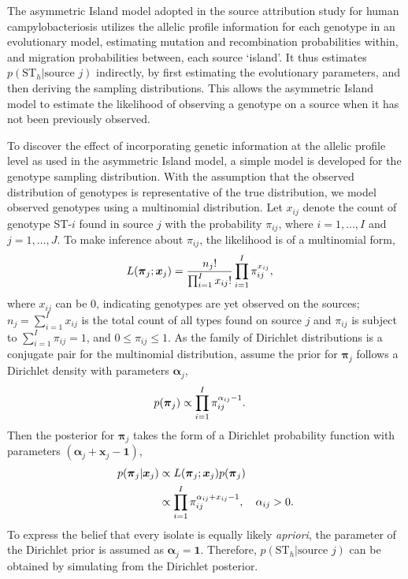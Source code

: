 \documentclass[AMA,STIX1COL]{WileyNJD-v2}
\begin{document}
The asymmetric Island model \cite{Wilso} adopted in the source attribution study for human campylobacteriosis \cite{Marsh} utilizes the allelic profile information for each genotype in an evolutionary model, estimating mutation and recombination probabilities within, and migration probabilities between, each source `island'. It thus estimates $p(\text{ST}_h \vert \text{source }j)$ indirectly, by first estimating the evolutionary parameters, and then deriving the sampling distributions. This allows the asymmetric Island model to estimate the likelihood of observing a genotype on a source when it has not been previously observed.

To discover the effect of incorporating genetic information at the allelic profile level as used in the asymmetric Island model, a simple model is developed for the genotype sampling distribution. With the assumption that the observed distribution of genotypes is representative of the true distribution, we model observed genotypes using a multinomial distribution. Let $x_{ij}$ denote the count of genotype ST-$i$ found in source $j$ with the probability $\pi_{ij}$, where $i=1, \ldots, I$ and $j=1, \ldots, J$. To make inference about $\pi_{ij}$, the likelihood is of a multinomial form,
\begin{align}
        L(\boldsymbol{\pi}_{j} ; \boldsymbol{x}_{j}) & = \frac{n_j!}{\prod_{i=1}^{I} x_{ij}!} \prod_{i=1}^I \pi_{ij}^{x_{ij}}, \notag
\end{align}
where $x_{ij}$ can be $0$, indicating genotypes are yet observed on the sources; $n_j=\sum_{i=1}^I x_{ij}$ is the total count of all types found on source $j$ and $\pi_{ij}$ is subject to $\sum_{i=1}^I \pi_{ij} =1$, and $0 \leq \pi_{ij} \leq 1$. As the family of Dirichlet distributions is a conjugate pair for the multinomial distribution, assume the prior for $\boldsymbol{\pi}_{j}$ follows a Dirichlet density with parameters $\boldsymbol{\alpha}_{j}$,
\begin{align}
  p(\boldsymbol{\pi}_{j}) & \propto \prod_{i=1}^{I}\pi_{ij}^{\alpha_{ij}-1}. \notag
\end{align}
Then the posterior for $\boldsymbol{\pi}_{j}$ takes the form of a Dirichlet probability function with parameters $(\boldsymbol{\alpha}_{j}+\boldsymbol{x}_{j}-\boldsymbol{1})$,
\begin{align}
        p(\boldsymbol{\pi}_{j} \vert \boldsymbol{x}_{j} ) & \propto L(\boldsymbol{\pi}_{j} ; \boldsymbol{x}_{j}) p(\boldsymbol{\pi}_{j}) \notag \\
       & \propto \prod_{i=1}^{I}\pi_{ij}^{\alpha_{ij} + x_{ij}-1}, \quad \alpha_{ij} >0. \notag
 \end{align}
To express the belief that every isolate is equally likely \emph{apriori}, the parameter of the Dirichlet prior is assumed as $\boldsymbol{\alpha}_{j}=\boldsymbol{1}$. Therefore, $p(\text{ST}_h \vert \text{source }j)$ can be obtained by simulating from the Dirichlet posterior.
\end{document}
